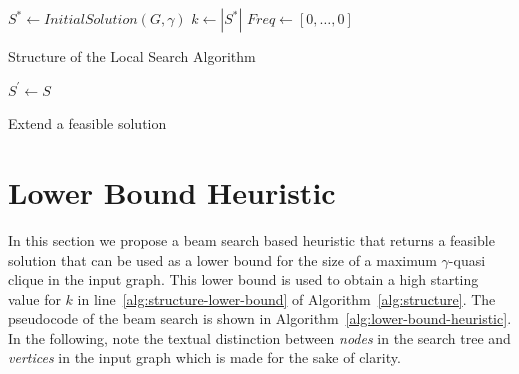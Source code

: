 \documentclass[draft,final]{vutinfth} %
\begin{document}
\begin{algorithm}
    \DontPrintSemicolon
    $S^* \gets \mathit{InitialSolution}(G, \gamma)$ \;
    $k \gets |S^*|$ \; \label{alg:structure-lower-bound}
    $\mathit{Freq} \gets [0, \dots, 0]$ \label{alg:structure-freq}  

    \caption{Structure of the Local Search Algorithm}
    \label{alg:structure}
\end{algorithm}

\begin{algorithm}
    \DontPrintSemicolon
    $S^\prime \gets S$ \;
    \caption{Extend a feasible solution}
    \label{alg:extend}
\end{algorithm}

\section{Lower Bound Heuristic}\label{sec:lower-bound-heuristic}

In this section we propose a beam search based heuristic that returns a feasible solution that can be used as a lower bound for the size of a maximum $\gamma$-quasi clique in the input graph. This lower bound is used to obtain a high starting value for $k$ in line~\ref{alg:structure-lower-bound} of Algorithm~\ref{alg:structure}. 
The pseudocode of the beam search is shown in Algorithm~\ref{alg:lower-bound-heuristic}. 
In the following, note the textual distinction between \emph{nodes} in the search tree and \emph{vertices} in the input graph which is made for the sake of clarity. 
\end{document}
